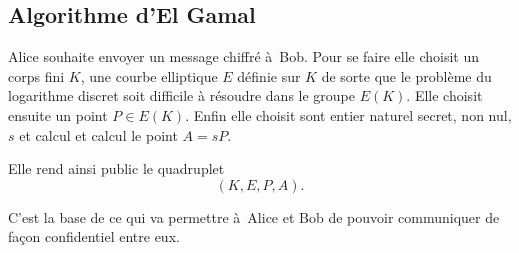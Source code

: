 







\subsection{Algorithme d'El Gamal}

Alice souhaite envoyer un message chiffré à Bob. Pour se faire elle choisit un corps fini $K$, une courbe elliptique $E$ définie sur $K$ de sorte que le problème du logarithme discret soit difficile à résoudre dans le groupe $E(K)$. Elle choisit ensuite un point $P \in E(K)$. Enfin elle choisit sont entier naturel secret, non nul, $s$ et calcul et calcul le point $A=sP$.

Elle rend ainsi public le quadruplet 
\[
    (K,E,P,A)
.\] 

C'est la base de ce qui va permettre à Alice et Bob de pouvoir communiquer de façon confidentiel entre eux.

